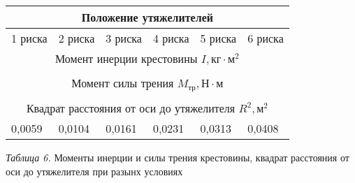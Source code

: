 \begin{center}
    \begin{tabular}{|p{2cm}|p{2cm}|p{2cm}|p{2cm}|p{2cm}|p{2cm}|}
        \hline
        \multicolumn{6}{|c|}{Положение утяжелителей} \\
        \hline
        1 риска & 2 риска & 3 риска & 4 риска & 5 риска & 6 риска \\
        \hline
        \multicolumn{6}{|c|}{Момент инерции крестовины $I, \text{кг} \cdot \text{м}^2$} \\
        \hline
            &       &       &       &       &       \\
        \hline
        \multicolumn{6}{|c|}{Момент силы трения $M_{\text{тр}}, \text{Н} \cdot \text{м}$} \\
        \hline
            &       &       &       &       &       \\
        \hline
        \multicolumn{6}{|c|}{Квадрат расстояния от оси до утяжелителя $R^2, \text{м}^2$} \\
        \hline
          0,0059  &    0,0104   &   0,0161    &    0,0231   &    0,0313   &    0,0408   \\
        \hline

    \end{tabular}

    \smallvspace

    \textit{Таблица 6.} Моменты инерции и силы трения крестовины, квадрат расстояния от оси до утяжелителя при разынх условиях
\end{center}
